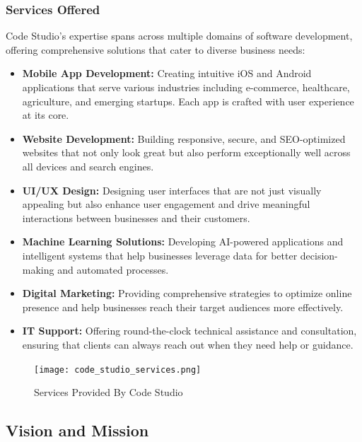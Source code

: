 \documentclass[12pt,a4paper]{article}
\begin{document}
\subsubsection{Services Offered}

Code Studio's expertise spans across multiple domains of software development, offering comprehensive solutions that cater to diverse business needs:

\begin{itemize}
    \item \textbf{Mobile App Development:} Creating intuitive iOS and Android applications that serve various industries including e-commerce, healthcare, agriculture, and emerging startups. Each app is crafted with user experience at its core.
    
    \item \textbf{Website Development:} Building responsive, secure, and SEO-optimized websites that not only look great but also perform exceptionally well across all devices and search engines.
    
    \item \textbf{UI/UX Design:} Designing user interfaces that are not just visually appealing but also enhance user engagement and drive meaningful interactions between businesses and their customers.
    
    \item \textbf{Machine Learning Solutions:} Developing AI-powered applications and intelligent systems that help businesses leverage data for better decision-making and automated processes.
    
    \item \textbf{Digital Marketing:} Providing comprehensive strategies to optimize online presence and help businesses reach their target audiences more effectively.
    
    \item \textbf{IT Support:} Offering round-the-clock technical assistance and consultation, ensuring that clients can always reach out when they need help or guidance.
\end{itemize}

\begin{figure}[H]
    \centering
    \texttt{[image: code\_studio\_services.png]}
    \caption{Services Provided By Code Studio}
    \label{fig:services_overview}
\end{figure}

\subsection{Vision and Mission}
\end{document}
